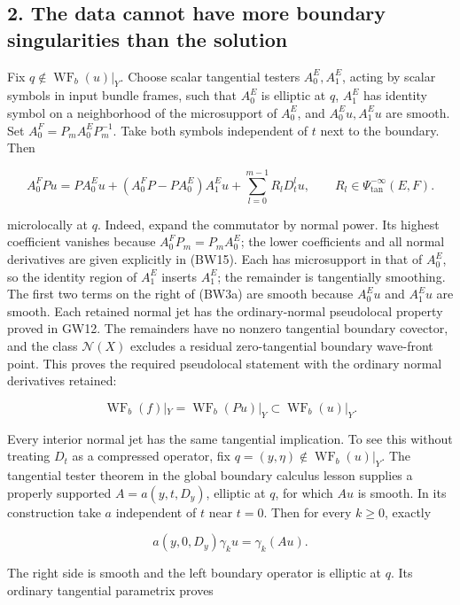 \documentclass[
  11pt,
]{article}
\begin{document}
\subsection{2. The data cannot have more boundary singularities than the
solution}\label{the-data-cannot-have-more-boundary-singularities-than-the-solution}

Fix \(q\notin\operatorname{WF}_b(u)|_Y\). Choose scalar tangential
testers \(A_0^E,A_1^E\), acting by scalar symbols in input bundle
frames, such that \(A_0^E\) is elliptic at \(q\), \(A_1^E\) has identity
symbol on a neighborhood of the microsupport of \(A_0^E\), and
\(A_0^Eu,A_1^Eu\) are smooth. Set \(A_0^F=P_mA_0^EP_m^{-1}\). Take both
symbols independent of \(t\) next to the boundary. Then

\[
 A_0^FPu=P A_0^Eu+
       (A_0^FP-PA_0^E)A_1^Eu+
       \sum_{l=0}^{m-1}R_lD_t^lu,
 \qquad R_l\in\Psi^{-\infty}_{\mathrm{tan}}(E,F).
 \tag{BW3a}
\]

microlocally at \(q\). Indeed, expand the commutator by normal power.
Its highest coefficient vanishes because \(A_0^FP_m=P_mA_0^E\); the
lower coefficients and all normal derivatives are given explicitly in
(BW15). Each has microsupport in that of \(A_0^E\), so the identity
region of \(A_1^E\) inserts \(A_1^E\); the remainder is tangentially
smoothing. The first two terms on the right of (BW3a) are smooth because
\(A_0^Eu\) and \(A_1^Eu\) are smooth. Each retained normal jet has the
ordinary-normal pseudolocal property proved in GW12. The remainders have
no nonzero tangential boundary covector, and the class \(\mathcal N(X)\)
excludes a residual zero-tangential boundary wave-front point. This
proves the required pseudolocal statement with the ordinary normal
derivatives retained:

\[
 \operatorname{WF}_b(f)|_Y
 =\operatorname{WF}_b(Pu)|_Y
 \subset\operatorname{WF}_b(u)|_Y.
 \tag{BW4}
\]

Every interior normal jet has the same tangential implication. To see
this without treating \(D_t\) as a compressed operator, fix
\(q=(y,\eta)\notin\operatorname{WF}_b(u)|_Y\). The tangential tester
theorem in the global boundary calculus lesson supplies a properly
supported \(A=a(y,t,D_y)\), elliptic at \(q\), for which \(Au\) is
smooth. In its construction take \(a\) independent of \(t\) near
\(t=0\). Then for every \(k\geq0\), exactly

\[
 a(y,0,D_y)\gamma_ku=\gamma_k(Au).
 \tag{BW5}
\]

The right side is smooth and the left boundary operator is elliptic at
\(q\). Its ordinary tangential parametrix proves
\end{document}

